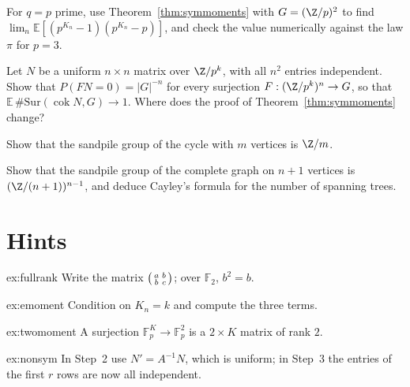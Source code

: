 \begin{exercise}[$\star\star$]\label{ex:twomoment}
For $q=p$ prime, use Theorem~\ref{thm:symmoments} with $G=(\Z/p)^2$ to find $\lim_n\mathbb E[(p^{K_n}-1)(p^{K_n}-p)]$, and check the value numerically against the law $\pi$ for $p=3$.
\end{exercise}

\begin{exercise}[$\star\star$]\label{ex:nonsym}
Let $N$ be a uniform $n\times n$ matrix over $\Z/p^k$, with all $n^2$ entries independent. Show that $P(FN=0)=|G|^{-n}$ for every surjection $F:(\Z/p^k)^n\to G$, so that $\mathbb E\,\#\mathrm{Sur}(\operatorname{cok}N,G)\to1$. Where does the proof of Theorem~\ref{thm:symmoments} change?
\end{exercise}

\begin{exercise}[$\star$]\label{ex:cycle}
Show that the sandpile group of the cycle with $m$ vertices is $\Z/m$.
\end{exercise}

\begin{exercise}[$\star\star$]\label{ex:complete}
Show that the sandpile group of the complete graph on $n+1$ vertices is $(\Z/(n+1))^{n-1}$, and deduce Cayley's formula for the number of spanning trees.
\end{exercise}

\section{Hints}

\begin{hint}{ex:fullrank}
Write the matrix $\begin{psmallmatrix}a&b\\b&c\end{psmallmatrix}$; over $\mathbb F_2$, $b^2=b$.
\end{hint}

\begin{hint}{ex:emoment}
Condition on $K_n=k$ and compute the three terms.
\end{hint}

\begin{hint}{ex:twomoment}
A surjection $\mathbb F_p^K\to\mathbb F_p^2$ is a $2\times K$ matrix of rank $2$.
\end{hint}

\begin{hint}{ex:nonsym}
In Step~2 use $N'=A^{-1}N$, which is uniform; in Step~3 the entries of the first $r$ rows are now all independent.
\end{hint}

